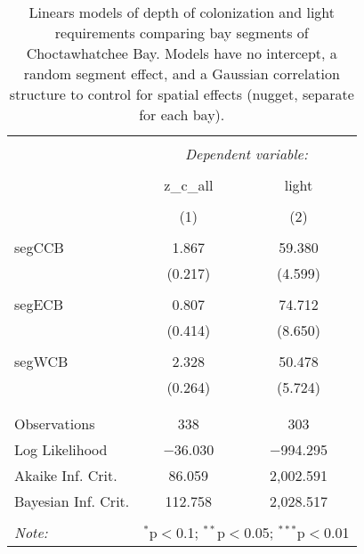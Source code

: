 \documentclass[letterpaper,12pt]{article}\usepackage[]{graphicx}\usepackage[]{color}
\begin{document}
\begin{table}[!htbp] \centering 
  \caption{Linears models of depth of colonization and light requirements comparing bay segments of Choctawhatchee Bay.  Models have no intercept, a random segment effect, and a Gaussian correlation structure to control for spatial effects (nugget, separate for each bay).} 
  \label{} 
\begin{tabular}{@{\extracolsep{5pt}}lcc} 
\\[-1.8ex]\hline 
\hline \\[-1.8ex] 
 & \multicolumn{2}{c}{\textit{Dependent variable:}} \\ 
\cline{2-3} 
\\[-1.8ex] & z\_c\_all & light \\ 
\\[-1.8ex] & (1) & (2)\\ 
\hline \\[-1.8ex] 
 segCCB & 1.867 & 59.380 \\ 
  & (0.217) & (4.599) \\ 
  & & \\ 
 segECB & 0.807 & 74.712 \\ 
  & (0.414) & (8.650) \\ 
  & & \\ 
 segWCB & 2.328 & 50.478 \\ 
  & (0.264) & (5.724) \\ 
  & & \\ 
\hline \\[-1.8ex] 
Observations & 338 & 303 \\ 
Log Likelihood & $-$36.030 & $-$994.295 \\ 
Akaike Inf. Crit. & 86.059 & 2,002.591 \\ 
Bayesian Inf. Crit. & 112.758 & 2,028.517 \\ 
\hline 
\hline \\[-1.8ex] 
\textit{Note:}  & \multicolumn{2}{r}{$^{*}$p$<$0.1; $^{**}$p$<$0.05; $^{***}$p$<$0.01} \\ 
\end{tabular} 
\end{table} 
\end{document}
